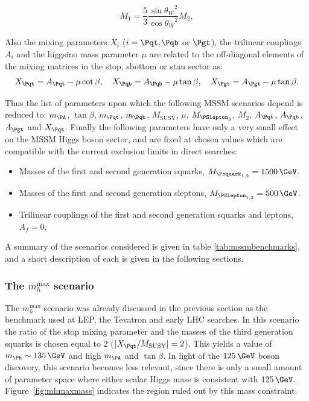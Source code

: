 \begin{equation}
M_{1} = \frac{5}{3}\frac{{\sin{\theta_{W}}}^{2}}{{\cos{\theta_{W}}}^{2}} M_{2},
\label{eq:GUTrelation}
\end{equation}

Also the mixing parameters $X_{i}$ ($i=\Pqt$,$\Pqb$ or
$\Pgt$), the trilinear couplings $A_{i}$ and the higgsino mass parameter $\mu$ 
are related to the off-diagonal elements of the mixing matrices in the
stop, sbottom or stau sector as:
\begin{equation}
X_{\Pqt} = A_{\Pqt} -\mu\cot\beta, \quad X_{\Pqb} = A_{\Pqb} -\mu\tan\beta,
\quad X_{\Pgt} = A_{\Pgt} -\mu\tan\beta .
\end{equation}

Thus the list of parameters upon which the following \ac{MSSM} scenarios depend is
reduced to: $m_{\PA}$, $\tan\beta$, $m_{\Pqt}$, $m_{\Pqb}$, $M_{\text{SUSY}}$,
$\mu$, $M_{\PSlepton_{3}}$, $M_{2}$, $A_{\Pqt}$, $A_{\Pqb}$, $A_{\Pgt}$ and
$X_{\Pqt}$. Finally the following parameters have only a very small effect on
the \ac{MSSM} Higgs boson sector, and are fixed at chosen values which are compatible
with the current exclusion limits in direct searches:

\begin{itemize}
\item Masses of the first and second generation squarks, $M_{\Psquark_{1,2}} =
1500\,\GeV$.
\item Masses of the first and second generation sleptons, $M_{\PSlepton_{1,2}}
= 500\,\GeV$.
\item Trilinear couplings of the first and second generation squarks and
leptons, $A_{f} = 0$.
\end{itemize}

A summary of the scenarios considered is given in table
\ref{tab:mssmbenchmarks}, and a short description of each is given in the
following sections.

\subsubsection{The $m_{h}^{\text{max}}$ scenario}
\label{sec:mhmaxscenario}

The $m_{h}^{\text{max}}$ scenario was already discussed in the previous section
as the benchmark used at LEP, the Tevatron and early LHC searches. 
In this scenario the ratio of the stop mixing parameter and the
masses of the third generation squarks is chosen equal to 2
($|X_{\Pqt}/M_{\text{SUSY}}| = 2$). This yields a value of
$m_{\Ph}\sim135\,\GeV$ and high $m_{\PA}$ and $\tan\beta$. 
In light of the $125\,\GeV$ boson discovery, this scenario becomes less relevant,
since there is only a small amount of parameter space where either scalar
Higgs mass is consistent with $125\,\GeV$. Figure~\ref{fig:mhmaxmass} indicates
the region ruled out by this mass constraint. 

